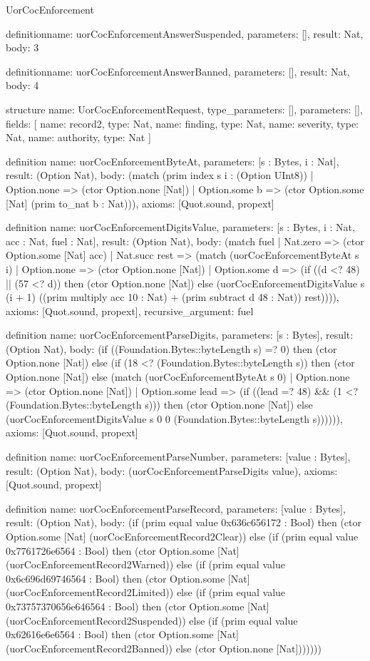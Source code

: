 \begin{lexlean}{UorCocEnforcement}
\begin{semanticmodule}
definition{name: uorCocEnforcementAnswerSuspended, parameters: [], result: Nat, body: 3}

definition{name: uorCocEnforcementAnswerBanned, parameters: [], result: Nat, body: 4}

structure{
  name: UorCocEnforcementRequest,
  type_parameters: [],
  parameters: [],
  fields: [
    {name: record2, type: Nat},
    {name: finding, type: Nat},
    {name: severity, type: Nat},
    {name: authority, type: Nat}
  ]
}

definition{
  name: uorCocEnforcementByteAt,
  parameters: [s : Bytes, i : Nat],
  result: (Option Nat),
  body: (match (prim index s i : (Option UInt8))
    | Option.none => (ctor Option.none [Nat])
    | Option.some b => (ctor Option.some [Nat] (prim to_nat b : Nat))),
  axioms: [Quot.sound, propext]
}

definition{
  name: uorCocEnforcementDigitsValue,
  parameters: [s : Bytes, i : Nat, acc : Nat, fuel : Nat],
  result: (Option Nat),
  body: (match fuel
    | Nat.zero => (ctor Option.some [Nat] acc)
    | Nat.succ rest => (match (uorCocEnforcementByteAt s i)
      | Option.none => (ctor Option.none [Nat])
      | Option.some d => (if ((d <? 48) || (57 <? d)) then (ctor Option.none [Nat]) else (uorCocEnforcementDigitsValue s (i + 1) ((prim multiply acc 10 : Nat) + (prim subtract d 48 : Nat)) rest)))),
  axioms: [Quot.sound, propext],
  recursive_argument: fuel
}

definition{
  name: uorCocEnforcementParseDigits,
  parameters: [s : Bytes],
  result: (Option Nat),
  body: (if ((Foundation.Bytes::byteLength s) =? 0) then (ctor Option.none [Nat]) else (if (18 <? (Foundation.Bytes::byteLength s)) then (ctor Option.none [Nat]) else (match (uorCocEnforcementByteAt s 0)
    | Option.none => (ctor Option.none [Nat])
    | Option.some lead => (if ((lead =? 48) && (1 <? (Foundation.Bytes::byteLength s))) then (ctor Option.none [Nat]) else (uorCocEnforcementDigitsValue s 0 0 (Foundation.Bytes::byteLength s)))))),
  axioms: [Quot.sound, propext]
}

definition{
  name: uorCocEnforcementParseNumber,
  parameters: [value : Bytes],
  result: (Option Nat),
  body: (uorCocEnforcementParseDigits value),
  axioms: [Quot.sound, propext]
}

definition{
  name: uorCocEnforcementParseRecord,
  parameters: [value : Bytes],
  result: (Option Nat),
  body: (if (prim equal value 0x636c656172 : Bool) then (ctor Option.some [Nat] (uorCocEnforcementRecord2Clear)) else (if (prim equal value 0x7761726e6564 : Bool) then (ctor Option.some [Nat] (uorCocEnforcementRecord2Warned)) else (if (prim equal value 0x6c696d69746564 : Bool) then (ctor Option.some [Nat] (uorCocEnforcementRecord2Limited)) else (if (prim equal value 0x73757370656e646564 : Bool) then (ctor Option.some [Nat] (uorCocEnforcementRecord2Suspended)) else (if (prim equal value 0x62616e6e6564 : Bool) then (ctor Option.some [Nat] (uorCocEnforcementRecord2Banned)) else (ctor Option.none [Nat]))))))
}


\end{semanticmodule}
\end{lexlean}

